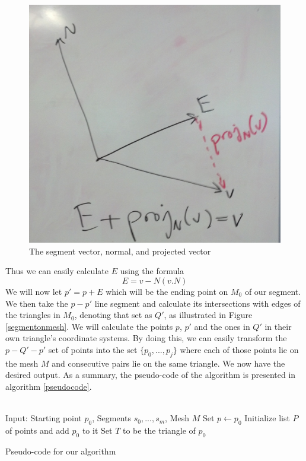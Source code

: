 \begin{figure}[ht]
\centering
\includegraphics[width=\columnwidth]{vectordiagram.jpg}
\caption{The segment vector, normal, and projected vector}
\label{vectordiagram}
\end{figure}

Thus we can easily calculate $E$ using the formula
\[
E = v - N(v.N)
\]
We will now let $p' = p+E$ which will be the ending point on $M_0$ of our segment. We then take the $p-p'$ line segment and calculate its intersections with edges of the triangles in $M_0$, denoting that set as $Q'$, as illustrated in Figure \ref{segmentonmesh}. We will calculate the points $p$, $p'$ and the ones in $Q'$ in their own triangle's coordinate systems. By doing this, we can easily transform the $p-Q'-p'$ set of points into the set $\{p_0,...,p_j\}$ where each of those points lie on the mesh $M$ and consecutive pairs lie on the same triangle. We now have the desired output. As a summary, the pseudo-code of the algorithm is presented in algorithm \ref{pseudocode}. \\
\\
\begin{algorithm}[t]
Input: Starting point $p_0$, Segments $s_0,...,s_m$, Mesh $M$\;
Set $p \leftarrow p_0$ \;
Initialize list $P$ of points and add $p_0$ to it \;
Set $T$ to be the triangle of $p_0$ \;
\caption{Pseudo-code for our algorithm}
\label{pseudocode}
\end{algorithm}

